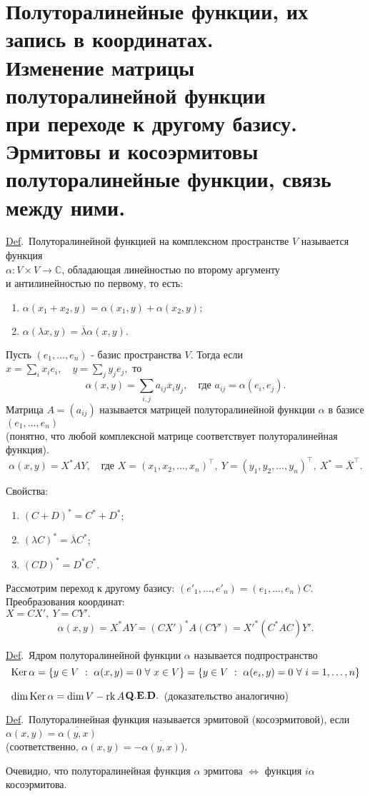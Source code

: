 \documentclass[draft]{article}%
\newcommand{\rk}{{\rm rk\,}}%
\newcommand{\de}{\par\noindent\underline{Def}.\ }%
\newcommand{\ab}{\par\noindent}%
\newcommand{\te}{\par\noindent{\bf Теорема.}\ }%
\newcommand{\qed}{\quad${{\bf Q.E.D.}}$}
\newcommand{\baz}[1]{\left(#1_1,\dots,#1_n\right)}%
\newcommand{\lr}{\Leftrightarrow}%
\newcommand{\nn}[1]{#1_1,#1_2,\dots,#1_n}%
\newcommand{\rom}[1]{{\rm#1\,}}
\begin{document}
\section{Полуторалинейные функции, их запись в координатах.\\ Изменение матрицы полуторалинейной функции\\ при переходе к другому базису.
Эрмитовы и косоэрмитовы\\ полуторалинейные функции, связь между ними.} %
\label{q21}%
\de Полуторалинейной функцией на комплексном пространстве $V$ называется функция\\ $\alpha: V\times V\rightarrow
\mathbb{C}$, обладающая линейностью по второму аргументу\\ и антилинейностью по первому, то есть:
\begin{enumerate}
    \item $\alpha(x_1+x_2, y)=\alpha(x_1,y)+\alpha(x_2,y);$
    \item $\alpha(\lambda x, y)=\overline{\lambda}\alpha(x,y).$
\end{enumerate}
\ab Пусть $\baz{e}$ - базис пространства $V$. Тогда если $x=\sum\limits_ix_ie_i,\quad y=\sum\limits_jy_je_j,$ то
$$
\alpha(x,y)=\sum_{i,j}a_{ij}\overline{x}_iy_j,\quad\mbox{где }a_{ij}=\alpha(e_i,e_j).
$$
Матрица $A=(a_{ij})$ называется матрицей полуторалинейной функции $\alpha$ в базисе $\baz{e}$\\ (понятно, что
любой комплексной матрице соответствует полуторалинейная функция).
$$
\alpha(x,y)=X^* AY,\quad\mbox{где }X=(\nn{x})^\top,\ Y=(\nn{y})^\top,\ X^*=\overline{X}^\top .
$$
\ab Свойства:
\begin{enumerate}
    \item $(C+D)^*=C^*+D^*$;
    \item $(\lambda C)^*=\overline{\lambda}C^*$;
    \item $(CD)^*=D^*C^*.$
\end{enumerate}
\ab Рассмотрим переход к другому базису: $\baz{e'}=\baz{e}C.$ Преобразования координат:\\ $X=CX',\ Y=CY'.$
$$
\alpha(x,y)=X^*AY=(CX')^*A(CY')=X'^*(C^*AC)Y'.
$$
\de Ядром полуторалинейной функции $\alpha$ называется подпространство $$\rom{Ker}\alpha=\{y\in V\ :\
\alpha(x,y)=0\ \forall\ x\in V\}=\{y\in V\ :\ \alpha(e_i,y)=0\ \forall\ i=1,\dots ,n\}$$ %
\te $\dim\rom{Ker}\alpha=\dim V-\rk A$\qed\ (доказательство аналогично)%
\de Полуторалинейная функция называется эрмитовой (косоэрмитовой), если
$\alpha(x,y)=\overline{\alpha(y,x)}$\\
(соответственно, $\alpha(x,y)=-\overline{\alpha(y,x)}$). %
\ab Очевидно, что полуторалинейная функция $\alpha$ эрмитова $\lr$ функция $i\alpha$ косоэрмитова. %
\end{document}
